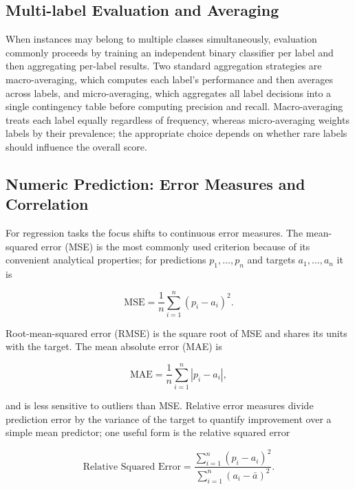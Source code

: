 \subsection{Multi-label Evaluation and Averaging}

When instances may belong to multiple classes simultaneously, evaluation commonly proceeds by training an independent binary classifier per label and then aggregating per-label results. Two standard aggregation strategies are macro-averaging, which computes each label's performance and then averages across labels, and micro-averaging, which aggregates all label decisions into a single contingency table before computing precision and recall. Macro-averaging treats each label equally regardless of frequency, whereas micro-averaging weights labels by their prevalence; the appropriate choice depends on whether rare labels should influence the overall score.

\subsection{Numeric Prediction: Error Measures and Correlation}

For regression tasks the focus shifts to continuous error measures. The mean-squared error (MSE) is the most commonly used criterion because of its convenient analytical properties; for predictions $p_1,\ldots,p_n$ and targets $a_1,\ldots,a_n$ it is

\begin{equation}
\text{MSE} = \frac{1}{n} \sum_{i=1}^n (p_i - a_i)^2.
\end{equation}

Root-mean-squared error (RMSE) is the square root of MSE and shares its units with the target. The mean absolute error (MAE) is

\begin{equation}
\text{MAE} = \frac{1}{n} \sum_{i=1}^n |p_i - a_i|,
\end{equation}

and is less sensitive to outliers than MSE. Relative error measures divide prediction error by the variance of the target to quantify improvement over a simple mean predictor; one useful form is the relative squared error

\begin{equation}
\text{Relative Squared Error} = \frac{\sum_{i=1}^n (p_i - a_i)^2}{\sum_{i=1}^n (a_i - \bar{a})^2}.
\end{equation}

